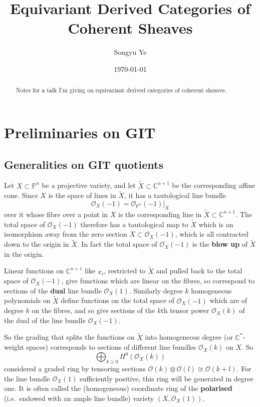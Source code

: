 \documentclass[12pt]{article}
\begin{document}
\rhead{\today}
\cfoot{\thepage}

\title{Equivariant Derived Categories of Coherent Sheaves}

\author{Songyu Ye}
\date{\today}
\maketitle


\begin{abstract}
Notes for a talk I'm giving on equivariant derived categories of coherent sheaves.
\end{abstract}

\tableofcontents

\section{Preliminaries on GIT}
\subsection{Generalities on GIT quotients}
Let $X \subset \mathbb{P}^n$ be a projective variety, and let $\widetilde{X} \subset \mathbb{C}^{n+1}$ be the corresponding affine cone.
Since $X$ is the space of lines in $\widetilde{X}$, it has a tautological line bundle 
\[
\mathcal{O}_X(-1) = \mathcal{O}_{\mathbb{P}^n}(-1)\big|_X
\]
over it whose fibre over a point in $X$ is the corresponding line in 
$\widetilde{X} \subset \mathbb{C}^{n+1}$. The total space of $\mathcal{O}_X(-1)$ therefore 
has a tautological map to $\widetilde{X}$ which is an isomorphism away from the zero section 
$X \subset \mathcal{O}_X(-1)$, which is all contracted down to the origin in $\widetilde{X}$. 
In fact the total space of $\mathcal{O}_X(-1)$ is the \textbf{blow up} of $\widetilde{X}$ in the origin.

Linear functions on $\mathbb{C}^{n+1}$ like $x_i$, restricted to $\widetilde{X}$ and pulled 
back to the total space of $\mathcal{O}_X(-1)$, give functions which are linear on the fibres, 
so correspond to sections of the \textbf{dual} line bundle $\mathcal{O}_X(1)$. Similarly degree $k$ 
homogeneous polynomials on $\widetilde{X}$ define functions on the total space of $\mathcal{O}_X(-1)$ 
which are of degree $k$ on the fibres, and so give sections of the $k$th tensor power 
$\mathcal{O}_X(k)$ of the dual of the line bundle $\mathcal{O}_X(-1)$.

So the grading that splits the functions on $\widetilde{X}$ into homogeneous degree 
(or $\mathbb{C}^*$-weight spaces) corresponds to sections of different line bundles $\mathcal{O}_X(k)$ 
on $X$. So
\[
\bigoplus_{k \ge 0} H^0(\mathcal{O}_X(k))
\]
considered a graded ring by tensoring sections 
$\mathcal{O}(k) \otimes \mathcal{O}(l) \cong \mathcal{O}(k+l)$. For the line bundle $\mathcal{O}_X(1)$ 
sufficiently positive, this ring will be generated in degree one. It is often called the 
(homogeneous) coordinate ring of the \textbf{polarised} (i.e.~endowed with an ample line bundle) 
variety $(X,\mathcal{O}_X(1))$.
\end{document}
